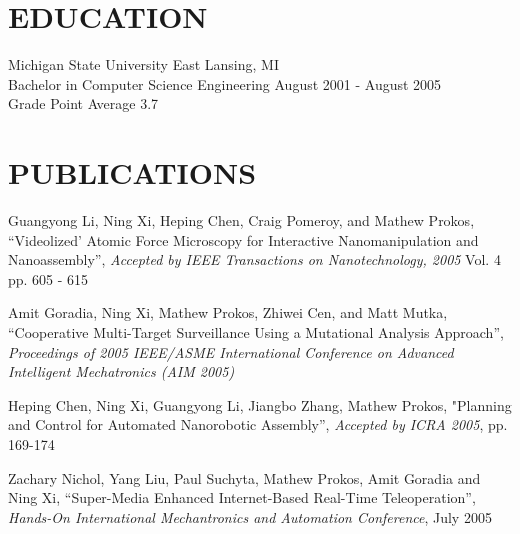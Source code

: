 \documentclass[line]{res}
\begin{document}
\begin{resume}
\section{EDUCATION} 
\vspace{1mm}
   Michigan State University \hfill East Lansing, MI\\
   Bachelor in Computer Science Engineering \hfill August 2001 - August 2005\\
   Grade Point Average 3.7\\

\vspace{-5mm}
\section{PUBLICATIONS} 
   \vspace{1mm}
   Guangyong Li, Ning Xi, Heping Chen, Craig Pomeroy, and Mathew Prokos,
   ``Videolized' Atomic Force Microscopy for Interactive Nanomanipulation and Nanoassembly'',
   \textsl{Accepted by IEEE Transactions on Nanotechnology, 2005} Vol. 4 pp. 605 - 615

   \vspace{-2mm}
   Amit Goradia, Ning Xi, Mathew Prokos, Zhiwei Cen, and Matt Mutka,
   ``Cooperative Multi-Target Surveillance Using a Mutational Analysis Approach'',
   \textsl{Proceedings of 2005 IEEE/ASME International Conference on
      Advanced Intelligent Mechatronics (AIM 2005)}

   \vspace{-2mm}
   Heping Chen, Ning Xi, Guangyong Li, Jiangbo Zhang, Mathew Prokos,
   "Planning and Control for Automated Nanorobotic Assembly'',
   \textsl{Accepted by ICRA 2005}, pp. 169-174

   \vspace{-2mm}
   Zachary Nichol, Yang Liu, Paul Suchyta, Mathew Prokos, Amit Goradia and Ning Xi, 
   ``Super-Media Enhanced Internet-Based Real-Time Teleoperation'',
   \textsl{Hands-On International Mechantronics and Automation Conference}, July 2005
\end{resume}
\end{document}
